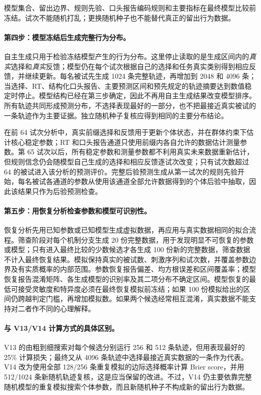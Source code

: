 模型集合、留出边界、规则先验、口头报告编码规则和主要指标在最终模型比较前冻结。试次不能随机打乱；更换随机种子也不能替代真正的留出行为数据。

\paragraph{第四步：模型冻结后生成完整行为分布。}
自主生成只用于检验冻结模型产生的行为分布。这里停止读取的是生成区间内的\emph{真实}选择和\emph{真实}反馈；模型仍在每个试次根据自己的选择和任务真实类别得到相应反馈，并继续更新。每名被试先生成 1024 条完整轨迹，再增加到 2048 和 4096 条；当选择、RT、结构化口头报告、主要预测区间和预先规定的轨迹摘要达到数值稳定时停止。模型结构已经在第三步确定，因此不再用自主生成结果改变模型排序。所有轨迹共同形成预测分布，不选择表现最好的一部分，也不把最接近真实被试的一条轨迹作为主要证据。独立随机种子复核应得到相同的主要分布结论。

在前 64 试次分析中，真实前缀选择和反馈用于更新个体状态，并在群体约束下估计核心稳定参数；RT 和口头报告通道只使用前缀内各自允许的数据估计测量参数。第 65 试次以后，所有稳定参数和测量参数都不利用真实未来数据重新估计，但规则信念仍会随模型自己生成的选择和相应反馈逐试次改变；只有试次数超过 64 的被试进入该分析的预测评价。完整后验预测生成从第一试次的规则先验开始，每名被试各通道的参数从使用该通道全部允许数据得到的个体后验中抽取，因此该结果只作为后验预测检查。

\paragraph{第五步：用恢复分析检查参数和模型可识别性。}
恢复分析先用已知参数或已知模型生成虚拟数据，再应用与真实数据相同的拟合流程。筛查阶段对每个机制分支生成 20 份完整数据，用于发现明显不可恢复的参数或模型；只有进入最终比较的少数候选才各生成 100 份新的完整数据，筛查数据不计入最终恢复结果。模拟保持真实的被试数、刺激序列和试次数，并覆盖参数边界及有实质概率的内部范围。参数恢复报告偏差、均方根误差和区间覆盖率；模型恢复报告混淆矩阵、各生成模型的识别率及其二项分布不确定区间。模型恢复的最低可接受灵敏度和特异度必须在最终恢复模拟前冻结；如果 100 份模拟给出的区间仍跨越判定门槛，再增加模拟数。如果两个候选经常相互混淆，真实数据不能支持对二者作不同的心理解释。

\paragraph{与 V13/V14 计算方式的具体区别。}
V13 的由粗到细搜索对每个候选分别运行 256 和 512 条轨迹，但用表现最好的 25\% 计算损失；最终又从 4096 条轨迹中选择最接近真实数据的一条作为代表。V14 改为使用全部 128/256 条重复模拟的边际选择概率计算 Brier score，并用 512/1024 条新随机轨迹复核，这是应当保留的改进。不过，V14 仍主要依靠完整随机模型的重复模拟搜索个体参数，而且新随机种子不构成新的留出行为数据。

